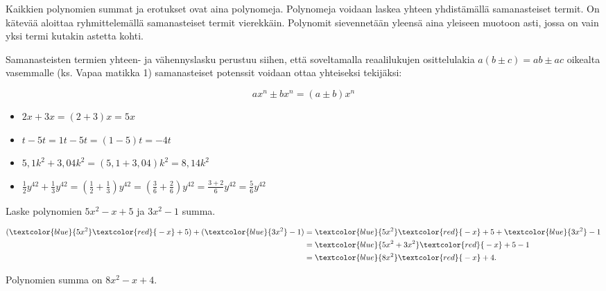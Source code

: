 Kaikkien polynomien summat ja erotukset ovat aina polynomeja. Polynomeja voidaan laskea yhteen yhdistämällä samanasteiset termit. On kätevää aloittaa ryhmittelemällä samanasteiset termit vierekkäin. Polynomit sievennetään yleensä aina yleiseen muotoon asti, jossa on vain yksi termi kutakin astetta kohti.

Samanasteisten termien yhteen- ja vähennyslasku perustuu siihen, että soveltamalla reaalilukujen osittelulakia $a(b\pm c)=ab\pm ac$ oikealta vasemmalle (ks. Vapaa matikka 1) samanasteiset potenssit voidaan ottaa yhteiseksi tekijäksi:

\[ ax^n \pm bx^n = (a \pm b)x^n \]

\begin{esimerkki}

	\begin{itemize}
	\item $2x+3x=(2+3)x=5x$
	\item $t-5t=1t-5t=(1-5)t=-4t$
	\item $5,1k^2+3,04k^2 = (5,1+3,04)k^2 = 8,14k^2$
	\item $\frac{1}{2}y^{42}+\frac{1}{3}y^{42}=(\frac{1}{2}+\frac{1}{3})y^{42}= (\frac{3}{6}+\frac{2}{6})y^{42}=\frac{3+2}{6}y^{42}=\frac{5}{6}y^{42}$
	\end{itemize}
\end{esimerkki}

\begin{esimerkki}
Laske polynomien $5x^2-x+5$ ja $3x^2-1$ summa.
    \begin{esimratk}
    
        \begin{align*}
            (\textcolor{blue}{5x^2} \textcolor{red}{{}-x} + 5) + (\textcolor{blue}{3x^2} -1) 
            &=\textcolor{blue}{5x^2} \textcolor{red}{{}-x} + 5 + \textcolor{blue}{3x^2} -1 \\
            &=\textcolor{blue}{5x^2+3x^2} \textcolor{red}{{}-x} +5-1\\
            &=\textcolor{blue}{8x^2} \textcolor{red}{{}-x}+4.
        \end{align*}     
    \end{esimratk}
    \begin{esimvast}
        Polynomien summa on $8x^2-x+4$.
    \end{esimvast}
\end{esimerkki}

